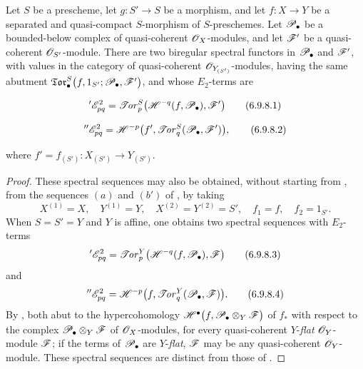 \begin{proposition}[6.9.8]
\label{III.6.9.8}
Let $S$ be a prescheme, let $g:S'\to S$ be a morphism, and let
$f:X\to Y$ be a separated and quasi-compact $S$-morphism of
$S$-preschemes.  Let $\mathscr{P}_\bullet$ be a bounded-below complex of
quasi-coherent $\mathscr{O}_X$-modules, and let $\mathscr{F}'$ be a
quasi-coherent $\mathscr{O}_{S'}$-module.  There are two biregular
spectral functors in $\mathscr{P}_\bullet$ and $\mathscr{F}'$, with values in
the category of quasi-coherent $\mathscr{O}_{Y_{(S')}}$-modules, having
the same abutment $\mathfrak{Tor}_\bullet^S
\bigl(
f,1_{S'};\mathscr{P}_\bullet,\mathscr{F}'
\bigr)$,
and whose $E_2$-terms are
\begin{env}[6.9.8.1]
\label{III.6.9.8.1}
\[
  {}'\mathscr{E}_{pq}^2
  =
  \mathscr{T}\!\mathit{or}_p^S
  \bigl(
    \mathscr{H}^{-q}(f,\mathscr{P}_\bullet),\mathscr{F}'
  \bigr)
  \tag{6.9.8.1}\label{III.6.9.8.1.eq}
\]
\end{env}
\begin{env}[6.9.8.2]
\label{III.6.9.8.2}
\[
  {}''\mathscr{E}_{pq}^2
  =
  \mathscr{H}^{-p}
  \bigl(
    f',
    \mathscr{T}\!\mathit{or}_q^S(\mathscr{P}_\bullet,\mathscr{F}')
  \bigr),
  \tag{6.9.8.2}\label{III.6.9.8.2.eq}
\]
\end{env}
where $f'=f_{(S')}:
X_{(S')}\longrightarrow Y_{(S')}$.
\end{proposition}

\begin{proof}
These spectral sequences may also be obtained, without starting
from , from the sequences $(a)$ and $(b')$ of
, by taking
\[
  X^{(1)}=X,\quad
  Y^{(1)}=Y,\quad
  X^{(2)}=Y^{(2)}=S',\quad
  f_1=f,\quad
  f_2=1_{S'}.
\]
When $S=S'=Y$ and $Y$ is affine, one obtains two spectral
sequences with $E_2$-terms
\[
  {}'\mathscr{E}_{pq}^2
  =
  \mathscr{T}\!\mathit{or}_p^Y
  \bigl(
    \mathscr{H}^{-q}(f,\mathscr{P}_\bullet),\mathscr{F}
  \bigr)
  \tag{6.9.8.3}\label{III.6.9.8.3}
\]
and
\[
  {}''\mathscr{E}_{pq}^2
  =
  \mathscr{H}^{-p}
  \bigl(
    f,\mathscr{T}\!\mathit{or}_q^Y(\mathscr{P}_\bullet,\mathscr{F})
  \bigr).
  \tag{6.9.8.4}\label{III.6.9.8.4}
\]
By , both abut to the hypercohomology $\mathscr{H}^\bullet
\bigl(
f,\mathscr{P}_\bullet\otimes_Y\mathscr{F}
\bigr)$
of $f_*$ with respect to the complex
$\mathscr{P}_\bullet\otimes_Y\mathscr{F}$ of $\mathscr{O}_X$-modules, for every
quasi-coherent $Y$-\emph{flat} $\mathscr{O}_Y$-module $\mathscr{F}$; if the terms of
$\mathscr{P}_\bullet$ are $Y$-\emph{flat}, $\mathscr{F}$ may be any quasi-coherent
$\mathscr{O}_Y$-module.  These spectral sequences are distinct from
those of .
\end{proof}

